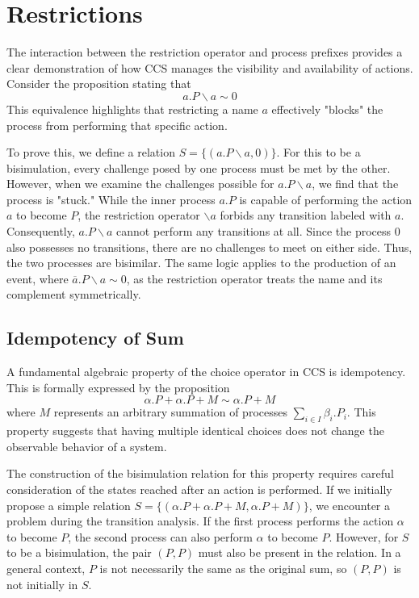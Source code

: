 \section{Restrictions}
The interaction between the restriction operator and process prefixes provides a clear demonstration of how CCS manages the visibility and availability of actions. Consider the proposition stating that
\begin{equation*}
    a.P\backslash a\sim 0
\end{equation*}
This equivalence highlights that restricting a name $a$ effectively "blocks" the process from performing that specific action.

To prove this, we define a relation $S=\{(a.P\backslash a,0)\}$. For this to be a bisimulation, every challenge posed by one process must be met by the other. However, when we examine the challenges possible for $a.P\backslash a$, we find that the process is "stuck." While the inner process $a.P$ is capable of performing the action $a$ to become $P$, the restriction operator $\backslash a$ forbids any transition labeled with $a$. Consequently, $a.P\backslash a$ cannot perform any transitions at all. Since the process $0$ also possesses no transitions, there are no challenges to meet on either side. Thus, the two processes are bisimilar. The same logic applies to the production of an event, where $\overline{a}.P\backslash a\sim 0$, as the restriction operator treats the name and its complement symmetrically.

\subsection{Idempotency of Sum}
A fundamental algebraic property of the choice operator in CCS is idempotency. This is formally expressed by the proposition 
\begin{equation*}
    \alpha.P+\alpha.P+M\sim \alpha.P+M
\end{equation*}
where $M$ represents an arbitrary summation of processes $\sum_{i\in I}\beta_i.P_i$. This property suggests that having multiple identical choices does not change the observable behavior of a system.

The construction of the bisimulation relation for this property requires careful consideration of the states reached after an action is performed. If we initially propose a simple relation $S=\{(\alpha.P+\alpha.P+M,\alpha.P+M)\}$, we encounter a problem during the transition analysis. If the first process performs the action $\alpha$ to become $P$, the second process can also perform $\alpha$ to become $P$. However, for $S$ to be a bisimulation, the pair $(P,P)$ must also be present in the relation. In a general context, $P$ is not necessarily the same as the original sum, so $(P,P)$ is not initially in $S$.

